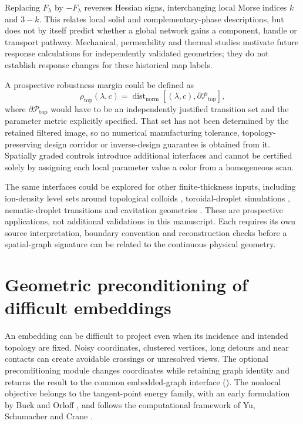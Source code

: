\documentclass[10pt,twocolumn]{article}
\begin{document}
Replacing $F_\lambda$ by $-F_\lambda$ reverses Hessian signs, interchanging local Morse indices $k$ and $3-k$. This relates local solid and complementary-phase descriptions, but does not by itself predict whether a global network gains a component, handle or transport pathway. Mechanical, permeability and thermal studies \cite{kg_maskery2018tpms,kg_castro2019tpms_permeability,kg_santos2020tpms_permeability,kg_liu2022tpms_topological_design,kg_gado2024tpms} motivate future response calculations for independently validated geometries; they do not establish response changes for these historical map labels.

A prospective robustness margin could be defined as
\begin{equation}
\rho_{\mathrm{top}}(\lambda,c)=\operatorname{dist}_{\mathrm{norm}}\!\left[(\lambda,c),\partial\mathcal P_{\mathrm{top}}\right],
\label{suppeq:tpms_topological_margin}
\end{equation}
where $\partial\mathcal P_{\mathrm{top}}$ would have to be an independently justified transition set and the parameter metric explicitly specified. That set has not been determined by the retained filtered image, so no numerical manufacturing tolerance, topology-preserving design corridor or inverse-design guarantee is obtained from it. Spatially graded controls introduce additional interfaces and cannot be certified solely by assigning each local parameter value a color from a homogeneous scan.

The same interfaces could be explored for other finite-thickness inputs, including ion-density level sets around topological colloids \cite{kg_everts2018doublelayer}, toroidal-droplet simulations \cite{kg_wu2024torusdroplets}, nematic-droplet transitions \cite{kg_koizumi2023nematic} and cavitation geometries \cite{kg_wang2014bubble,kg_wang2015bubble}. These are prospective applications, not additional validations in this manuscript. Each requires its own source interpretation, boundary convention and reconstruction checks before a spatial-graph signature can be related to the continuous physical geometry.
\FloatBarrier

\section{Geometric preconditioning of difficult embeddings}
\label{supp:repulsive_layout}
An embedding can be difficult to project even when its incidence and intended topology are fixed. Noisy coordinates, clustered vertices, long detours and near contacts can create avoidable crossings or unresolved views. The optional preconditioning module changes coordinates while retaining graph identity and returns the result to the common embedded-graph interface (). The nonlocal objective belongs to the tangent-point energy family, with an early formulation by Buck and Orloff \cite{kg_buck1995energy}, and follows the computational framework of Yu, Schumacher and Crane \cite{kg_yu2021repulsive}.
\end{document}
